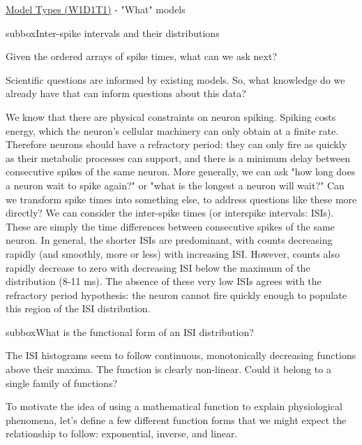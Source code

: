 \begin{textbox}{\href{https://compneuro.neuromatch.io/tutorials/W1D1_ModelTypes/student/W1D1_Tutorial1.html}{Model Types (W1D1T1)} -  "What" models}
\begin{subbox}{subbox}{Inter-spike intervals and their distributions}
\scriptsize

Given the ordered arrays of spike times, what can we ask next?

Scientific questions are informed by existing models. So, what knowledge do we already have that can inform questions about this data?

We know that there are physical constraints on neuron spiking. Spiking costs energy, which the neuron's cellular machinery can only obtain at a finite rate. Therefore neurons should have a refractory period: they can only fire as quickly as their metabolic processes can support, and there is a minimum delay between consecutive spikes of the same neuron.
More generally, we can ask "how long does a neuron wait to spike again?" or "what is the longest a neuron will wait?" Can we transform spike times into something else, to address questions like these more directly?
We can consider the inter-spike times (or interspike intervals: ISIs). These are simply the time differences between consecutive spikes of the same neuron.
In general, the shorter ISIs are predominant, with counts decreasing rapidly (and smoothly, more or less) with increasing ISI. However, counts also rapidly decrease to zero with decreasing ISI below the maximum of the distribution (8-11 ms). The absence of these very low ISIs agrees with the refractory period hypothesis: the neuron cannot fire quickly enough to populate this region of the ISI distribution.

\end{subbox}
\begin{subbox}{subbox}{What is the functional form of an ISI distribution?}
\scriptsize


The ISI histograms seem to follow continuous, monotonically decreasing functions above their maxima. The function is clearly non-linear. Could it belong to a single family of functions?

To motivate the idea of using a mathematical function to explain physiological phenomena, let's define a few different function forms that we might expect the relationship to follow: exponential, inverse, and linear.

\begin{center}
    

\end{center}
\end{subbox}
\end{textbox}
